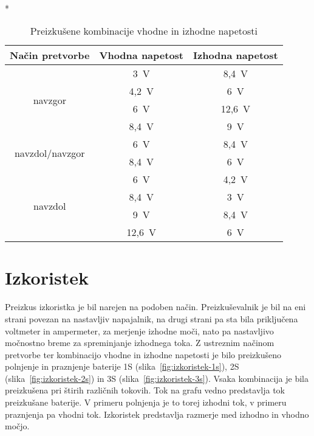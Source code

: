 \documentclass[a4paper,twoside,openright,12pt,slovene]{book}
\begin{document}
\begin{table}[H]
    \centering
    \caption{\label{tab:preizkusene-kombinacije} Preizkušene kombinacije vhodne in izhodne napetosti}~\\*
    \begin{tabular}{ccc}
        \hline
        \multicolumn{1}{l}{\textbf{Način pretvorbe}} & \multicolumn{1}{l}{\textbf{Vhodna napetost}} & \multicolumn{1}{l}{\textbf{Izhodna napetost}} \\ \hline
        \multirow{4}{*}{navzgor}                     & 3~V                                          & 8,4~V                                         \\ \cline{2-3}
        & 4,2~V                                        & 6~V                                           \\ \cline{2-3}
        & 6~V                                          & 12,6~V                                        \\ \cline{2-3}
        & 8,4~V                                        & 9~V                                           \\ \hline
        \multirow{2}{*}{navzdol/navzgor}             & 6~V                                          & 8,4~V                                         \\ \cline{2-3}
        & 8,4~V                                        & 6~V                                           \\ \hline
        \multirow{4}{*}{navzdol}                     & 6~V                                          & 4,2~V                                         \\ \cline{2-3}
        & 8,4~V                                        & 3~V                                           \\ \cline{2-3}
        & 9~V                                          & 8,4~V                                         \\ \cline{2-3}
        & 12,6~V                                       & 6~V                                           \\ \hline
    \end{tabular}
\end{table}

\section{Izkoristek}\label{sec:izkoristek}
Preizkus izkoristka je bil narejen na podoben način.
Preizkuševalnik je bil na eni strani povezan na nastavljiv napajalnik, na drugi strani pa sta bila priključena voltmeter in ampermeter,
za merjenje izhodne moči, nato pa nastavljivo močnostno breme za spreminjanje izhodnega toka.
Z ustreznim načinom pretvorbe ter kombinacijo vhodne in izhodne napetosti je bilo preizkušeno polnjenje in praznjenje baterije
1S (slika~\ref{fig:izkoristek-1s}), 2S (slika~\ref{fig:izkoristek-2s}) in 3S (slika~\ref{fig:izkoristek-3s}).\@
Vsaka kombinacija je bila preizkušena pri štirih različnih tokovih.
Tok na grafu vedno predstavlja tok preizkušane baterije.
V primeru polnjenja je to torej izhodni tok, v primeru praznjenja pa vhodni tok.
Izkoristek predstavlja razmerje med izhodno in vhodno močjo.
\end{document}
